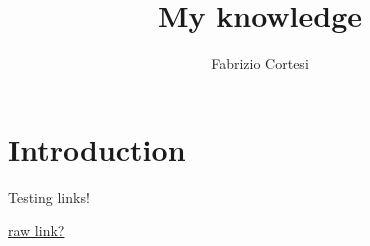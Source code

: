 \documentclass{article}
\title{My knowledge}
\author{Fabrizio Cortesi}
\begin{document}
\maketitle

\section*{Introduction}

Testing links!

\href{https://raw.githubusercontent.com/Fritz179/my_knowledge/master/link.pdf}{raw link?}
\end{document}
